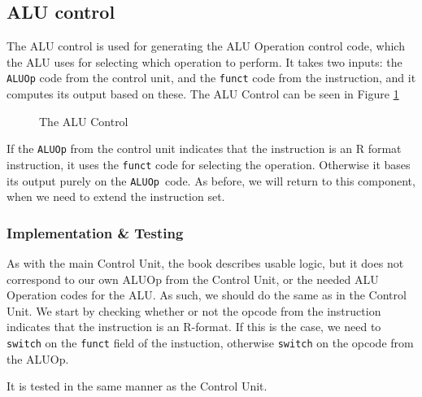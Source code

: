 \subsection{ALU control}\label{sec:alu-control}
The ALU control is used for generating the ALU Operation control code, which
the ALU uses for selecting which operation to perform. It takes two inputs: the
\texttt{ALUOp} code from the control unit, and the \texttt{funct} code from the
instruction, and it computes its output based on these. The ALU Control can be
seen in Figure \ref{fig:alu-cont}
\begin{figure}
    \centering
    \caption{The ALU Control}
    \label{fig:alu-cont}
\end{figure}

If the \texttt{ALUOp} from the control unit indicates that the instruction is
an R format instruction, it uses the \texttt{funct} code for selecting the
operation.  Otherwise it bases its output purely on the \texttt{ALUOp} code. As
before, we will return to this component, when we need to extend the
instruction set.

\subsubsection*{Implementation \& Testing}
As with the main Control Unit, the book describes usable logic, but it does not
correspond to our own ALUOp from the Control Unit, or the needed ALU Operation
codes for the ALU. As such, we should do the same as in the Control Unit. We
start by checking whether or not the opcode from the instruction indicates that
the instruction is an R-format. If this is the case, we need to \texttt{switch}
on the \texttt{funct} field of the instuction, otherwise \texttt{switch} on the
opcode from the ALUOp.

It is tested in the same manner as the Control Unit.

